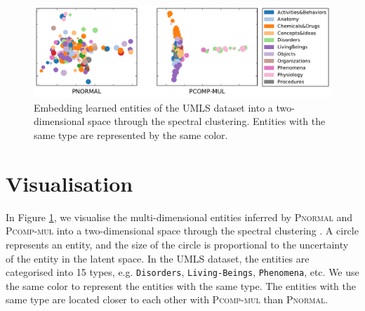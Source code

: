 \begin{figure}[t]
	\centering
	\includegraphics[width=0.7\linewidth]{images/embedding_umls.pdf}
	\caption{\label{fig:tsne} Embedding learned entities of the UMLS dataset into a two-dimensional space through the spectral clustering. Entities with the same type are represented by the same color.}
\end{figure}

\section{Visualisation}

\label{sec:vis}
In Figure \ref{fig:tsne}, we visualise the multi-dimensional entities inferred by \textsc{Pnormal} and \textsc{Pcomp-mul}
into a two-dimensional space through the spectral clustering \cite{von2007tutorial}.
A circle represents an entity, and the size of the circle is proportional to the uncertainty of the entity in the latent space.
In the UMLS dataset, the entities are categorised into 15 types,
e.g. \texttt{Disorders}, \texttt{Living-Beings}, \texttt{Phenomena}, etc.
We use the same color to represent the entities with the same type.
The entities with the same type are located closer to each other with \textsc{Pcomp-mul} than \textsc{Pnormal}.

